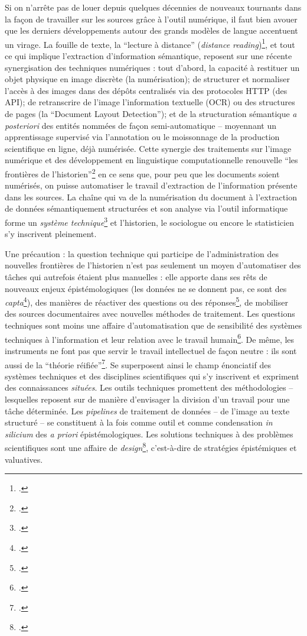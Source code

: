 Si on n'arrête pas de louer depuis quelques décennies de nouveaux tournants dans la façon de travailler sur les sources grâce à l'outil numérique, il faut bien avouer que les derniers développements autour des grands modèles de langue accentuent un virage. La fouille de texte, la \enquote{lecture à distance} (\textit{distance reading})\footcite{distant}, et tout ce qui implique l'extraction d'information sémantique, reposent sur une récente synergisation des techniques numériques : tout d'abord, la capacité à restituer un objet physique en image discrète (la numérisation); de structurer et normaliser l'accès à des images dans des dépôts centralisés via des protocoles HTTP (des API); de retranscrire de l'image l'information textuelle (OCR) ou des structures de pages (la \enquote{Document Layout Detection}); et de la structuration sémantique \textit{a posteriori} des entités nommées de façon semi-automatique -- moyennant un apprentissage supervisé via l'annotation ou le moissonnage de la production scientifique en ligne, déjà numérisée. Cette synergie des traitements sur l'image numérique et des développement en linguistique computationnelle renouvelle \enquote{les frontières de l'historien}\footcite{lamasse} en ce sens que, pour peu que les documents soient numérisés, on puisse automatiser le travail d'extraction de l'information présente dans les sources. La chaîne qui va de la numérisation du document à l'extraction de données sémantiquement structurées et son analyse via l'outil informatique forme un \textit{système technique}\footcite{meot} et l'historien, le sociologue ou encore le statisticien s'y inscrivent pleinement. 

Une précaution : la question technique qui participe de l'administration des nouvelles frontières de l'historien n'est pas seulement un moyen d'automatiser des tâches qui autrefois étaient plus manuelles : elle apporte dans ses rêts de nouveaux enjeux épistémologiques (les données ne se donnent pas, ce sont des \textit{capta}\footcite{drucker}), des manières de réactiver des questions ou des réponses\footcite[On peut penser ici à l'approche collingwoodienne de l'histoire ou encore à l'histoire dialectique de Walter Benjamin. Voir :][]{prost}, de mobiliser des sources documentaires avec nouvelles méthodes de traitement. Les questions techniques sont moins une affaire d'automatisation que de sensibilité des systèmes techniques à l'information et leur relation avec le travail humain\footcite{meot}. De même, les instruments ne font pas que servir le travail intellectuel de façon neutre : ils sont aussi de la \enquote{théorie réifiée}\footcite{bachelard}. Se superposent ainsi le champ énonciatif des systèmes techniques et des disciplines scientifiques qui s'y inscrivent et expriment des connaissances \textit{situées}. Les outils techniques promettent des méthodologies -- lesquelles reposent sur de manière d'envisager la division d'un travail pour une tâche déterminée. Les \textit{pipelines} de traitement de données -- de l'image au texte structuré -- se constituent à la fois comme outil et comme condensation \textit{in silicium} des \textit{a priori} épistémologiques. Les solutions techniques à des problèmes scientifiques sont une affaire de \textit{design}\footcite{renon}, c'est-à-dire de stratégies épistémiques et valuatives.


